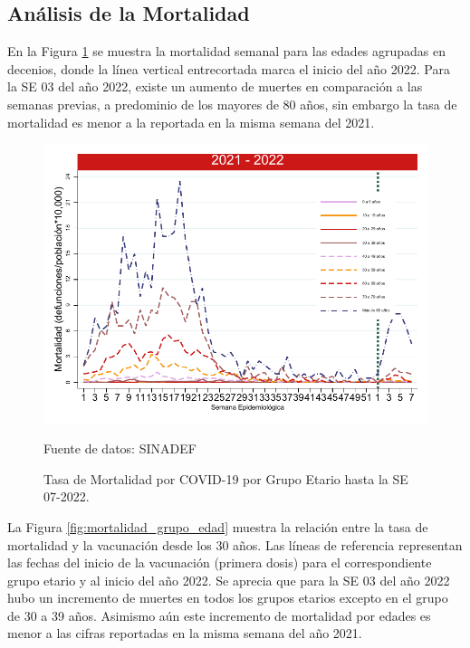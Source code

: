\documentclass[12pt,a4paper,openany]{book}
\begin{document}
	\subsection*{Análisis de la Mortalidad}

\noindent En la Figura \ref{fig:mortalidad_edad} se muestra la mortalidad semanal para las edades agrupadas en decenios, donde la línea vertical entrecortada marca el inicio del año 2022. Para la SE 03 del año 2022, existe un aumento de muertes en comparación a las semanas previas, a predominio de los mayores de 80 años, sin embargo la tasa de mortalidad es menor a la reportada en la misma semana del 2021. 
	 	
\begin{figure}[h]
	\caption{Tasa de Mortalidad por COVID-19 por Grupo Etario hasta la SE 07-2022.}\label{fig:mortalidad_edad}
	\begin{center}
		\includegraphics[width=0.65\linewidth]{../figuras/mortalidad_edad_2021_2022.pdf}
	\end{center}
	{\footnotesize Fuente de datos: SINADEF} 
\end{figure}


La Figura \ref{fig:mortalidad_grupo_edad} muestra la relación entre la tasa de mortalidad y la vacunación desde los 30 años. Las líneas de referencia representan las fechas del inicio de la vacunación (primera dosis) para el correspondiente grupo etario y al inicio del año 2022. Se aprecia que para la SE 03 del año 2022 hubo un incremento de muertes en todos los grupos etarios excepto en el grupo de 30 a 39 años. Asimismo aún este incremento de mortalidad por edades es menor a las cifras reportadas en la misma semana del año 2021.  
\end{document}
